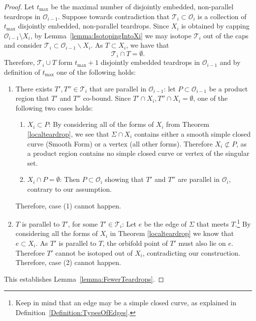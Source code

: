 \documentclass[12pt,reqno]{amsart}
\theoremstyle{plain}
\theoremstyle{definition}
\numberwithin{subcase}{case}
\theoremstyle{plain}
\theoremstyle{definition}
\newcommand{\OO}{\mathcal{O}}
\begin{document}
\begin{proof}
Let $t_{\text{max}}$ be the maximal number of disjointly embedded, non-parallel teardrops in $\OO_{i-1}$. Suppose towards contradiction that $\mathcal{T}_{i}\subset\OO_{i}$ is a collection of $t_{\text{max}}$ disjointly embedded, non-parallel teardrops. Since \(X_{i}\) is obtained by capping \(\OO_{i-1} \setminus X_{i}\), by Lemma~\ref{lemma:IsotopingIntoXi} we may isotope \(\mathcal{T}_{i}\) out of the caps and consider $\mathcal{T}_{i}\subset \OO_{i-1}\backslash X_i$.  As $T\subset X_i$, we have that 
$$\mathcal{T}_{i}\cap T=\emptyset.$$ 
Therefore, $\mathcal{T}_{i}\cup T$ form $t_{\text{max}}+1$ disjointly embedded teardrops in $\OO_{i-1}$ and by definition of \(t_{\text{max}}\) one of the following holds:
\begin{enumerate}
\item There exists $T',T''\in\mathcal{T}_{i}$ that are parallel in $\OO_{i-1}$: let $P\subset\OO_{i-1}$ be a product region that $T'$ and $T''$ co-bound. Since $T'\cap X_{i}, T''\cap X_{i}=\emptyset$, one of the following two cases holds:
\begin{enumerate}
\item $X_i\subset P$: By considering all of the forms of $X_i$ from Theorem \ref{localteardrop}, we see that $\Sigma\cap X_i$ contains either a smooth simple closed curve (Smooth Form) or a vertex (all other forms). Therefore $X_{i}\not\subset P$, as a product region contains no simple closed curve or vertex of the singular set.

\item $X_i\cap P=\emptyset$: Then $P\subset \OO_{i}$ showing that $T'$ and $T''$ are parallel in $\OO_{i}$, contrary to our assumption.
\end{enumerate}
Therefore, case (1) cannot happen. 

\item $T$ is parallel to $T'$, for some $T'\in\mathcal{T}_{i}$: Let \(e\) be the edge of $\Sigma$ that meets $T$.\footnote{ 
Keep in mind that an edge may be a simple closed curve, as explained in Definition~\ref{Definition:TypesOfEdges}.}
By considering all the forms of $X_i$ in Theorem \ref{localteardrop} we know that $e\subset X_i$. As $T'$ is parallel to $T$, the orbifold point of $T'$ must also lie on $e$.  Therefore $T'$ cannot be isotoped out of \(X_{i}\), contradicting our construction. Therefore, case (2) cannot happen.
\end{enumerate}
This establishes Lemma~\ref{lemma:FewerTeardrops}.
\end{proof}
\end{document}
